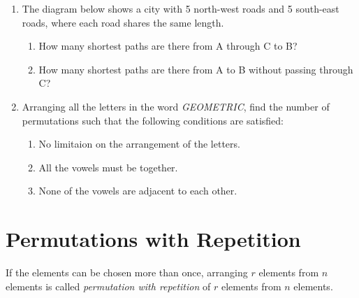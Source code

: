 \documentclass{report}
\begin{document}
\begin{multicols}{2}
\begin{enumerate}
    \item The diagram below shows a city with 5 north-west roads and 5 south-east roads,
          where each road shares the same length.
          \begin{center}
          \end{center}
          \begin{enumerate}
            \item How many shortest paths are there from A through C to B?
            \item How many shortest paths are there from A to B without passing through C?
          \end{enumerate}

    \item Arranging all the letters in the word \textit{GEOMETRIC}, find the number of
          permutations such that the following conditions are satisfied:
          \begin{enumerate}
            \item No limitaion on the arrangement of the letters.
            \item All the vowels must be together.
            \item None of the vowels are adjacent to each other.
          \end{enumerate}

  \end{enumerate}

  \section{Permutations with Repetition}

  If the elements can be chosen more than once, arranging $r$ elements from $n$
  elements is called \emph{permutation with repetition} of $r$ elements from $n$
  elements.


\end{multicols}
\end{document}
